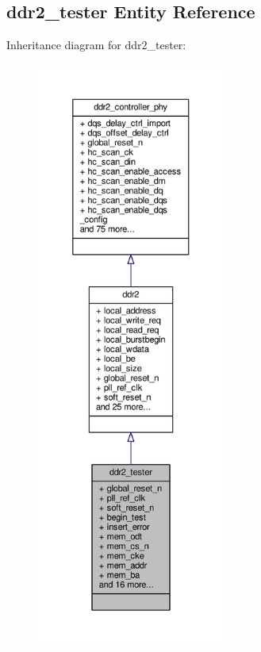 \subsection{ddr2\+\_\+tester Entity Reference}
\label{classddr2__tester}


Inheritance diagram for ddr2\+\_\+tester\+:\nopagebreak
\begin{figure}[H]
\begin{center}
\leavevmode
\includegraphics[height=550pt]{d1/daa/classddr2__tester__inherit__graph}
\end{center}
\end{figure}


